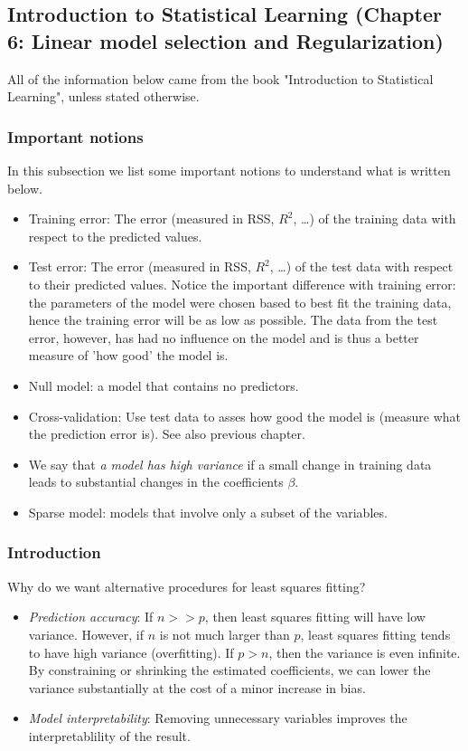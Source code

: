 
\subsection*{Introduction to Statistical Learning (Chapter 6: Linear model selection and Regularization)}
All of the information below came from the book "Introduction to Statistical Learning", unless stated otherwise.

\subsubsection*{Important notions}
In this subsection we list some important notions to understand what is written below.
\begin{itemize}
    \item Training error: The error (measured in RSS, $R^2$, \dots) of the training data with respect to the predicted values.
    \item Test error: The error (measured in RSS, $R^2$, \dots) of the test data with respect to their predicted values. Notice the important difference with training error: the parameters of the model were chosen based to best fit the training data, hence the training error will be as low as possible. The data from the test error, however, has had no influence on the model and is thus a better measure of 'how good' the model is.
    \item Null model: a model that contains no predictors.
    \item Cross-validation: Use test data to asses how good the model is (measure what the prediction error is). See also previous chapter.
    \item We say that \textit{a model has high variance} if a small change in training data leads to substantial changes in the coefficients $\beta$.
    \item Sparse model: models that involve only a subset of the variables.
\end{itemize}

\subsubsection*{Introduction}
Why do we want alternative procedures for least squares fitting?
\begin{itemize}
    \item \textit{Prediction accuracy}: If $n >> p$, then least squares fitting will have low variance. However, if $n$ is not much larger than $p$, least squares fitting tends to have high variance (overfitting). If $p > n$, then the variance is even infinite. By constraining or shrinking the estimated coefficients, we can lower the variance substantially at the cost of a minor increase in bias.
    \item \textit{Model interpretability}: Removing unnecessary variables improves the interpretablility of the result.
\end{itemize}

